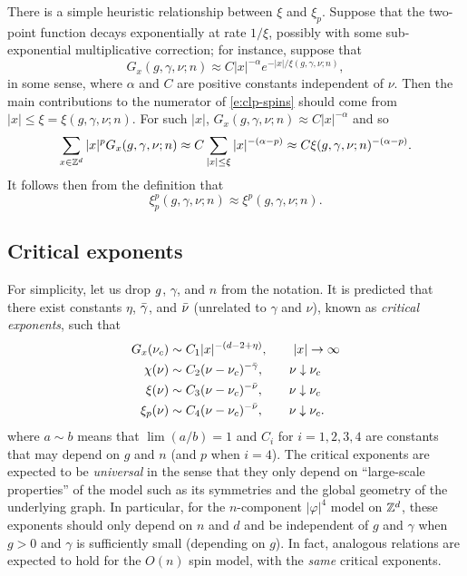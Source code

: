 \begin{rk}
There is a simple heuristic relationship between $\xi$ and $\xi_p$. Suppose that
the two-point function decays exponentially at rate $1/\xi$, possibly with some
sub-exponential multiplicative correction; for instance, suppose that
\begin{equation}
G_x(g, \gamma, \nu; n) \approx C |x|^{-\alpha} e^{-|x|/\xi(g, \gamma, \nu; n)},
\end{equation}
in some sense, where $\alpha$ and $C$ are positive constants independent of $\nu$.
Then the main contributions to the numerator of
\eqref{e:clp-spins} should come from $|x| \le \xi = \xi(g, \gamma, \nu; n)$. For such $|x|$,
$G_x(g, \gamma, \nu; n) \approx C |x|^{-\alpha}$ and so
\begin{equation}
\sum_{x\in{ {{\mathbb Z}}^d }} |x|^p G_x(g, \gamma, \nu; n)
	\approx
C \sum_{|x| \le \xi} |x|^{-(\alpha-p)}
	\approx
C \xi(g, \gamma, \nu; n)^{-(\alpha-p)}.
\end{equation}
It follows then from the definition that
\begin{equation}
\xi^p_p(g, \gamma, \nu; n) \approx \xi^p(g, \gamma, \nu; n).
\end{equation}
\end{rk}

\subsection{Critical exponents}

For simplicity, let us drop $g$, $\gamma$, and $n$ from the notation.
It is predicted that there exist constants $\eta$, $\bar\gamma$, and $\bar\nu$
(unrelated to $\gamma$ and $\nu$), known as \emph{critical exponents}, such that
\begin{align}
G_x(\nu_c)
	&\sim
C_1 |x|^{-(d - 2 + \eta)},
	\qquad
|x|\rightarrow\infty \\
\chi(\nu)
	&\sim
C_2 (\nu - \nu_c)^{-\bar\gamma},
	\qquad
\nu\downarrow\nu_c \\
\xi(\nu)
	&\sim
C_3 (\nu - \nu_c)^{-\bar\nu},
	\qquad
\nu\downarrow\nu_c \\
\xi_p(\nu)
	&\sim
C_4 (\nu - \nu_c)^{-\bar\nu},
	\qquad
\nu\downarrow\nu_c.
\end{align}
where $a \sim b$ means that $\lim (a/b) = 1$ and $C_i$ for $i = 1,2,3,4$
are constants that may depend on $g$ and $n$ (and $p$ when $i = 4$).
The critical exponents are expected to be \emph{universal} in the sense that they
only depend on ``large-scale properties'' of the model such as its symmetries and
the global geometry of the underlying graph. In particular,
for the $n$-component $|\varphi|^4$ model on ${ {{\mathbb Z}}^d }$, these exponents should only
depend on $n$ and $d$ and be independent of $g$ and $\gamma$ when $g > 0$ and $\gamma$
is sufficiently small (depending on $g$). In fact,
analogous relations are expected to hold for the $O(n)$ spin model, with the
\emph{same} critical exponents.

